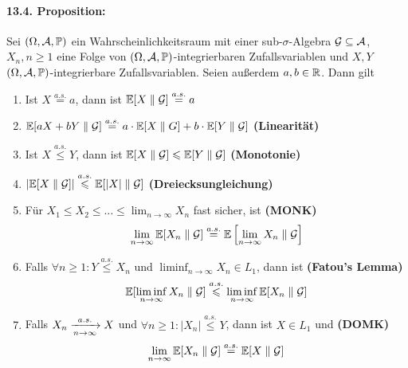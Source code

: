 \documentclass[11pt]{report}
\begin{document}
     \paragraph{13.4. Proposition:}Sei $(\Omega, \mathcal{A}, \mathbb{P})$ ein Wahrscheinlichkeitsraum mit einer sub-$\sigma$-Algebra $\mathcal{G}\subseteq\mathcal{A}$, $X_n,n\geq1$ eine Folge von $(\Omega, \mathcal{A}, \mathbb{P})$-integrierbaren Zufallsvariablen und $X,Y$ $(\Omega, \mathcal{A}, \mathbb{P})$-integrierbare Zufallsvariablen. Seien au\ss{}erdem $a,b\in\mathbb{R}$. Dann gilt
     \begin{enumerate}[label=(\roman*)]
         \item Ist $X\overset{a.s.}{=}a$, dann ist $\mathbb{E}[X\parallel \mathcal{G}]\overset{a.s.}{=}a$
         \item $\mathbb{E}[aX+bY\parallel\mathcal{G}]\overset{a.s.}{=}a\cdot\mathbb{E}[X\parallel G]+b\cdot\mathbb{E}[Y\parallel\mathcal{G}]$ \textbf{(Linearität)}
         \item Ist $X\overset{a.s.}{\leq}Y$, dann ist $\mathbb{E}[X\parallel\mathcal{G}]\leqslant\mathbb{E}[Y\parallel\mathcal{G}]$ \textbf{(Monotonie)}
         \item $\left|\mathbb{E}[X\parallel\mathcal{G}]\right|\overset{a.s.}{\leqslant}\mathbb{E}[|X|\parallel\mathcal{G}]$ \textbf{(Dreiecksungleichung)}
         \item Für $X_1\leq X_2\leq\hdots\leq\lim_{n\to\infty}X_n$ fast sicher, ist \textbf{(MONK)}
         $$\lim_{n\to\infty}\mathbb{E}[X_n\parallel\mathcal{G}]\overset{a.s.}{=}\mathbb{E}\left[\lim_{n\to\infty}X_n\parallel\mathcal{G}\right]$$
         \item Falls $\forall n\geq1:Y\overset{a.s.}{\leq} X_n$ und $\liminf_{n\to\infty}X_n\in L_1$, dann ist \textbf{(Fatou's Lemma)}
         $$\mathbb{E}[\liminf_{n\to\infty}X_n\parallel\mathcal{G}]\overset{a.s.}{\leqslant}\liminf_{n\to\infty}\mathbb{E}[X_n\parallel\mathcal{G}]$$
         \item Falls $X_n\nto{a.s.}{n\to\infty}X$ und $\forall n\geq1:|X_n|\overset{a.s.}{\leq}Y$, dann ist $X\in L_1$ und \textbf{(DOMK)}
         $$\lim_{n\to\infty}\mathbb{E}[X_n\parallel\mathcal{G}]\overset{a.s.}{=}\mathbb{E}[X\parallel\mathcal{G}]$$
     \end{enumerate}
     
\end{document}
